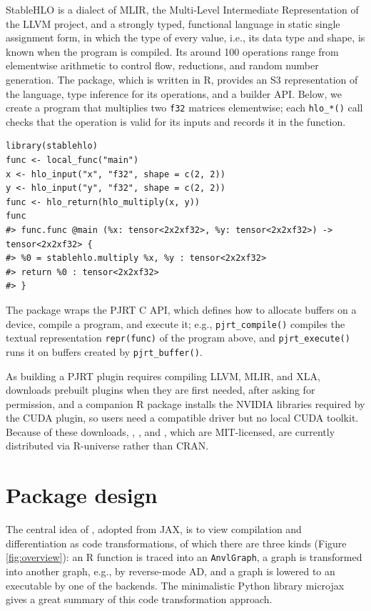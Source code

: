 StableHLO is a dialect of MLIR, the Multi-Level Intermediate Representation of the LLVM project, and a strongly typed, functional language in static single assignment form, in which the type of every value, i.e., its data type and shape, is known when the program is compiled.
Its around 100 operations range from elementwise arithmetic to control flow, reductions, and random number generation.
The  package, which is written in R, provides an S3 representation of the language, type inference for its operations, and a builder API.
Below, we create a program that multiplies two \texttt{f32} matrices elementwise; each \texttt{hlo\_*()} call checks that the operation is valid for its inputs and records it in the function.

\begin{verbatim}
library(stablehlo)
func <- local_func("main")
x <- hlo_input("x", "f32", shape = c(2, 2))
y <- hlo_input("y", "f32", shape = c(2, 2))
func <- hlo_return(hlo_multiply(x, y))
func
#> func.func @main (%x: tensor<2x2xf32>, %y: tensor<2x2xf32>) -> tensor<2x2xf32> {
#> %0 = stablehlo.multiply %x, %y : tensor<2x2xf32>
#> return %0 : tensor<2x2xf32>
#> }
\end{verbatim}

The  package wraps the PJRT C API, which defines how to allocate buffers on a device, compile a program, and execute it; e.g., \texttt{pjrt\_compile()} compiles the textual representation \texttt{repr(func)} of the program above, and \texttt{pjrt\_execute()} runs it on buffers created by \texttt{pjrt\_buffer()}.

As building a PJRT plugin requires compiling LLVM, MLIR, and XLA,  downloads prebuilt plugins when they are first needed, after asking for permission, and a companion R package installs the NVIDIA libraries required by the CUDA plugin, so users need a compatible driver but no local CUDA toolkit.
Because of these downloads, , , and , which are MIT-licensed, are currently distributed via R-universe rather than CRAN.

\section{Package design}\label{design}

The central idea of , adopted from JAX, is to view compilation and differentiation as code transformations, of which there are three kinds (Figure \ref{fig:overview}): an R function is traced into an \texttt{AnvlGraph}, a graph is transformed into another graph, e.g., by reverse-mode AD, and a graph is lowered to an executable by one of the backends.
The minimalistic Python library microjax \citep{ref-microjax} gives a great summary of this code transformation approach.

